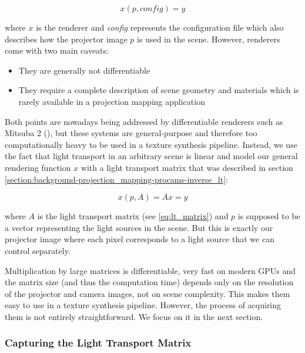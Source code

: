 \begin{equation}
    \label{eq:rendering_function-renderer}
    x(p, \textit{config}) = y
\end{equation}

where \(x\) is the renderer and \textit{config} represents the configuration file which also describes how the projector image \(p\) is used in the scene. However, renderers come with two main caveats:

\begin{itemize}
    \item They are generally not differentiable
    \item They require a complete description of scene geometry and materials which is rarely available in a projection mapping application
\end{itemize}

Both points are nowadays being addressed by differentiable renderers such as Mitsuba 2 (\citet{Mitsuba2}), but these systems are general-purpose and therefore too computationally heavy to be used in a texture synthesis pipeline. Instead, we use the fact that light transport in an arbitrary scene is linear and model our general rendering function \(x\) with a light transport matrix that was described in section \ref{section:background-projection_mapping-procams-inverse_lt}:

\begin{equation}
    \label{eq:rendering_function-lt_matrix}
    x(p, A) = Ax = y
\end{equation}

where \(A\) is the light transport matrix (see \ref{eq:lt_matrix}) and \(p\) is supposed to be a vector representing the light sources in the scene. But this is exactly our projector image where each pixel corresponds to a light source that we can control separately.

Multiplication by large matrices is differentiable, very fast on modern GPUs and the matrix size (and thus the computation time) depends only on the resolution of the projector and camera images, not on scene complexity. This makes them easy to use in a texture synthesis pipeline. However, the process of acquiring them is not entirely straightforward. We focus on it in the next section.

\subsubsection{Capturing the Light Transport Matrix}
\label{section:methods-rendering_function-general-lt_capture}

